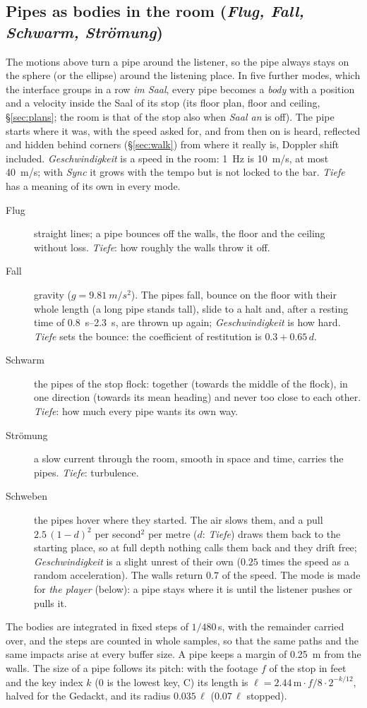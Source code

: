 \documentclass[11pt,a4paper,parskip=half,DIV=11,toc=bibliography]{scrartcl}
\newcommand{\ui}[1]{\emph{#1}}                 %
\begin{document}
\subsection{Pipes as bodies in the room (\ui{Flug, Fall, Schwarm, Strömung})}
\label{sec:roommotion}
The motions above turn a pipe around the listener, so the pipe always stays on the sphere (or the ellipse) around the
listening place. In five further modes, which the interface groups in a row \ui{im Saal}, every pipe becomes a
\emph{body} with a position and a velocity inside the Saal of its stop (its floor plan, floor and ceiling,
\S\ref{sec:plans}; the room is that of the stop also when \ui{Saal an} is off). The pipe starts where it was, with the
speed asked for, and from then on is heard, reflected and hidden behind corners (\S\ref{sec:walk}) from where it
really is, Doppler shift included. \ui{Geschwindigkeit} is a speed in the room: \SI{1}{Hz} is \SI{10}{m/s}, at most
\SI{40}{m/s}; with \ui{Sync} it grows with the tempo but is not locked to the bar. \ui{Tiefe} has a meaning of its own in
every mode.
\begin{description}
  \item[Flug] straight lines; a pipe bounces off the walls, the floor and the ceiling without loss. \ui{Tiefe}: how
        roughly the walls throw it off.
  \item[Fall] gravity ($g=\SI{9.81}{m/s^2}$). The pipes fall, bounce on the floor with their whole length (a long pipe
        stands tall), slide to a halt and, after a resting time of \SIrange{0.8}{2.3}{s}, are thrown up again;
        \ui{Geschwindigkeit} is how hard. \ui{Tiefe} sets the bounce: the coefficient of restitution is $0.3+0.65\,d$.
  \item[Schwarm] the pipes of the stop flock: together (towards the middle of the flock), in one direction (towards its
        mean heading) and never too close to each other. \ui{Tiefe}: how much every pipe wants its own way.
  \item[Strömung] a slow current through the room, smooth in space and time, carries the pipes. \ui{Tiefe}: turbulence.
  \item[Schweben] the pipes hover where they started. The air slows them, and a pull
        $2.5\,(1-d)^2$ per second$^2$ per metre ($d$: \ui{Tiefe}) draws them back to the starting place, so at full depth nothing calls them back and they drift
        free; \ui{Geschwindigkeit} is a slight unrest of their own ($0.25$ times the speed as a random acceleration). The
        walls return $0.7$ of the speed. The mode is made for \emph{the player} (below): a pipe stays where it is until
        the listener pushes or pulls it.
\end{description}
The bodies are integrated in fixed steps of $1/480$\,s, with the remainder carried over, and the steps are counted in
whole samples, so that the same paths and the same impacts arise at every buffer size. A pipe keeps a margin of
\SI{0.25}{m} from the walls. The size of a pipe follows its pitch: with the footage $f$ of the stop in feet and the key
index $k$ (0 is the lowest key, C) its length is $\ell = 2.44\,\mathrm{m}\cdot f/8\cdot
2^{-k/12}$, halved for the Gedackt, and its radius $0.035\,\ell$ ($0.07\,\ell$ stopped).
\end{document}
